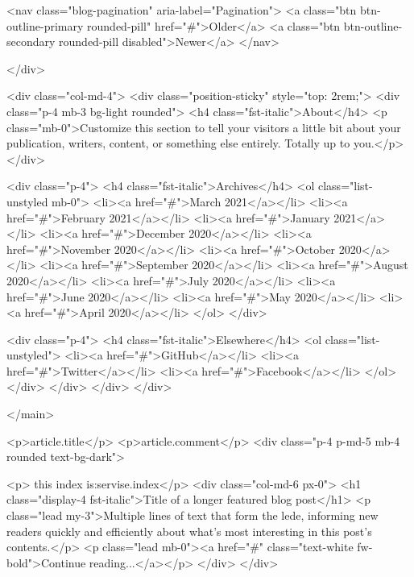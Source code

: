       <nav class="blog-pagination" aria-label="Pagination">
        <a class="btn btn-outline-primary rounded-pill" href="#">Older</a>
        <a class="btn btn-outline-secondary rounded-pill disabled">Newer</a>
      </nav>

    </div>

    <div class="col-md-4">
      <div class="position-sticky" style="top: 2rem;">
        <div class="p-4 mb-3 bg-light rounded">
          <h4 class="fst-italic">About</h4>
          <p class="mb-0">Customize this section to tell your visitors a little bit about your publication, writers, content, or something else entirely. Totally up to you.</p>
        </div>

        <div class="p-4">
          <h4 class="fst-italic">Archives</h4>
          <ol class="list-unstyled mb-0">
            <li><a href="#">March 2021</a></li>
            <li><a href="#">February 2021</a></li>
            <li><a href="#">January 2021</a></li>
            <li><a href="#">December 2020</a></li>
            <li><a href="#">November 2020</a></li>
            <li><a href="#">October 2020</a></li>
            <li><a href="#">September 2020</a></li>
            <li><a href="#">August 2020</a></li>
            <li><a href="#">July 2020</a></li>
            <li><a href="#">June 2020</a></li>
            <li><a href="#">May 2020</a></li>
            <li><a href="#">April 2020</a></li>
          </ol>
        </div>

        <div class="p-4">
          <h4 class="fst-italic">Elsewhere</h4>
          <ol class="list-unstyled">
            <li><a href="#">GitHub</a></li>
            <li><a href="#">Twitter</a></li>
            <li><a href="#">Facebook</a></li>
          </ol>
        </div>
      </div>
    </div>
  </div>

</main>

<p>{{article.title}}</p>
<p>{{article.comment}}</p>
<div class="p-4 p-md-5 mb-4 rounded text-bg-dark">

<p> this index is:{{servise.index}}</p>
    <div class="col-md-6 px-0">
      <h1 class="display-4 fst-italic">Title of a longer featured blog post</h1>
      <p class="lead my-3">Multiple lines of text that form the lede, informing new readers quickly and efficiently about what’s most interesting in this post’s contents.</p>
      <p class="lead mb-0"><a href="#" class="text-white fw-bold">Continue reading...</a></p>
    </div>
  </div>
